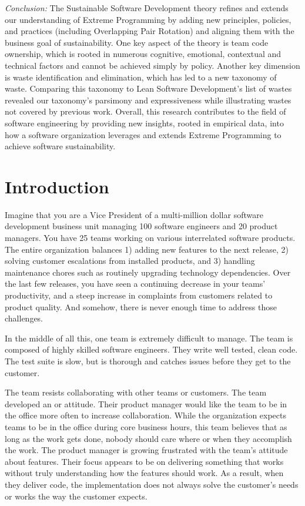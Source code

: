 \textit{Conclusion:} The Sustainable Software Development theory refines and extends our understanding of Extreme Programming by adding new principles, policies, and practices (including Overlapping Pair Rotation) and aligning them with the business goal of sustainability. One key aspect of the theory is team code ownership, which is rooted in numerous cognitive, emotional, contextual and technical factors and cannot be achieved simply by policy. Another key dimension is waste identification and elimination, which has led to a new taxonomy of waste. Comparing this taxonomy to Lean Software Development's list of wastes revealed our taxonomy's parsimony and expressiveness while illustrating wastes not covered by previous work. Overall, this research contributes to the field of software engineering by providing new insights, rooted in empirical data, into how a software organization leverages and extends Extreme Programming to achieve software sustainability.







\chapter{Introduction}
\label{IntroductionChapter}

Imagine that you are a Vice President of a multi-million dollar software development business unit managing 100 software engineers and 20 product managers. You have 25 teams working on various interrelated software products. The entire organization balances 1) adding new features to the next release, 2) solving customer escalations from installed products, and 3) handling maintenance chores such as routinely upgrading technology dependencies. Over the last few releases, you have seen a continuing decrease in your teams' productivity, and a steep increase in complaints from customers related to product quality. And somehow, there is never enough time to address those challenges.

In the middle of all this, one team is extremely difficult  to manage. The team is composed of highly skilled software engineers. They write well tested, clean code. The test suite is slow, but is thorough and catches issues before they get to the customer. 

The team resists collaborating with other teams or customers. The team developed an  or  attitude. Their product manager would like the team to be in the office more often to increase collaboration. While the organization expects teams to be in the office during core business hours, this team believes that as long as the work gets done, nobody should care where or when they accomplish the work. The product manager is growing frustrated with the team's attitude about features. Their focus appears to be on delivering something that works without truly understanding how the features should work. As a result, when they deliver code, the implementation does not always solve the customer's needs or works the way the customer expects. 

